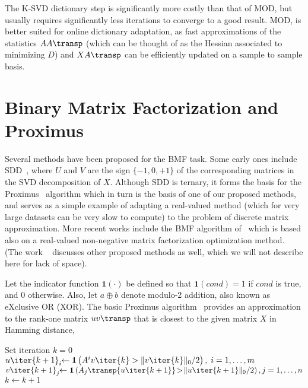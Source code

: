 \documentclass[twocolumn]{IEEEtran}
\begin{document}
The K-SVD dictionary step is significantly more costly than that of MOD, but usually requires significantly less iterations to converge to a good result. MOD, is better suited for online dictionary adaptation, as fast approximations of the statistics $AA\transp$ (which can be thought of as the Hessian associated to minimizing $D$)  and $XA\transp$ can be efficiently updated on a sample to sample basis.


\section{Binary Matrix Factorization and Proximus}

Several methods have been proposed for the BMF task. Some early ones include SDD~\cite{sdd}, where $U$ and $V$ are the sign $\{-1,0,+1\}$ of the corresponding matrices in the SVD decomposition of $X$. Although SDD is ternary, it forms the basis for the Proximus~\cite{proximus} algorithm which in turn is the basis of one of our proposed methods, and serves as a simple example of adapting a real-valued method (which for very large datasets can be very slow to compute) to the problem of discrete matrix approximation.
More recent works include the BMF algorithm of~\cite{zhang07} which is based also on a real-valued non-negative matrix factorization optimization method.
(The work ~\cite{zhang07} discusses other proposed methods as well, which we will not describe here for lack of space). %

\def\indicator{\mathbf{1}}
Let the indicator function $\indicator(\cdot)$ be defined so that $\indicator(cond)=1$ if $cond$ is true, and $0$ otherwise. Also, let $a \oplus b$ denote modulo-2 addition, also known as eXclusive OR (XOR). The basic Proximus algorithm~\cite{proximus} provides an approximation to the rank-one matrix $uv\transp$ that is closest to the given matrix $X$ in Hamming distance,
\def\bool{\mathrm{bool}}
\begin{algorithm}
Set iteration $k=0$\;
 {
  $u\iter{k+1}_i\!\! \leftarrow \indicator \left( A^i v\iter{k} > \|v\iter{k}\|_0/2 \right),\;i=1,\ldots,m$ \;
  $v\iter{k+1}_j\!\! \leftarrow \indicator\left(A_j\transp{u\iter{k+1}}\!>\!\|u\iter{k+1}\|_0/2 \right),j=1,\ldots,n$ \;
  $k \leftarrow k+1 $ \;
}
\label{alg:proximus}
\end{algorithm}
\end{document}
